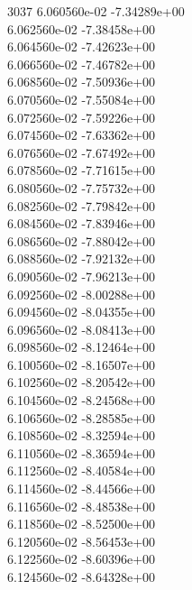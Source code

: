 3037	6.060560e-02	-7.34289e+00	\\ 	6.062560e-02	-7.38458e+00	\\ 	6.064560e-02	-7.42623e+00	\\ 	6.066560e-02	-7.46782e+00	\\ 	6.068560e-02	-7.50936e+00	\\ 	6.070560e-02	-7.55084e+00	\\ 	6.072560e-02	-7.59226e+00	\\ 	6.074560e-02	-7.63362e+00	\\ 	6.076560e-02	-7.67492e+00	\\ 	6.078560e-02	-7.71615e+00	\\ 	6.080560e-02	-7.75732e+00	\\ 	6.082560e-02	-7.79842e+00	\\ 	6.084560e-02	-7.83946e+00	\\ 	6.086560e-02	-7.88042e+00	\\ 	6.088560e-02	-7.92132e+00	\\ 	6.090560e-02	-7.96213e+00	\\ 	6.092560e-02	-8.00288e+00	\\ 	6.094560e-02	-8.04355e+00	\\ 	6.096560e-02	-8.08413e+00	\\ 	6.098560e-02	-8.12464e+00	\\ 	6.100560e-02	-8.16507e+00	\\ 	6.102560e-02	-8.20542e+00	\\ 	6.104560e-02	-8.24568e+00	\\ 	6.106560e-02	-8.28585e+00	\\ 	6.108560e-02	-8.32594e+00	\\ 	6.110560e-02	-8.36594e+00	\\ 	6.112560e-02	-8.40584e+00	\\ 	6.114560e-02	-8.44566e+00	\\ 	6.116560e-02	-8.48538e+00	\\ 	6.118560e-02	-8.52500e+00	\\ 	6.120560e-02	-8.56453e+00	\\ 	6.122560e-02	-8.60396e+00	\\ 	6.124560e-02	-8.64328e+00	\\ \hline
